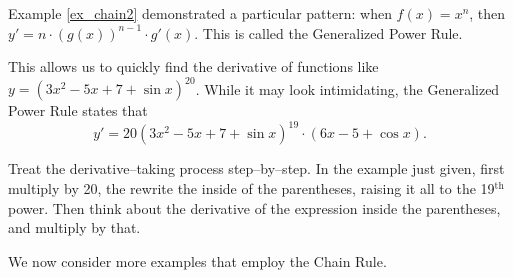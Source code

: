 Example \ref{ex_chain2} demonstrated a particular pattern: when $f(x)=x^n$, then $y' =n\cdot (g(x))^{n-1}\cdot g'(x)$. This  is called the Generalized Power Rule.\\



This allows us to quickly find the derivative of functions like $y = (3x^2-5x+7+\sin x)^{20}$. While it may look intimidating, the Generalized Power Rule states that $$y' = 20(3x^2-5x+7+\sin x)^{19}\cdot (6x-5+\cos x).$$

Treat the derivative--taking process step--by--step. In the example just given, first multiply by 20, the rewrite the inside of the parentheses, raising it all to the 19$^{\text{th}}$ power. Then think about the derivative of the expression inside the parentheses, and multiply by that.

%

We now consider more examples that employ the Chain Rule.\\

